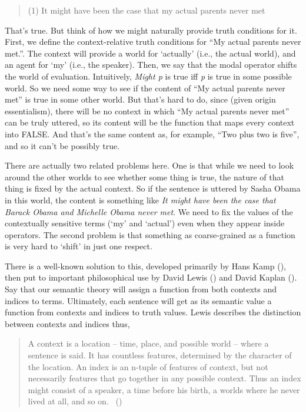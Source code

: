 \documentclass[
  11pt,
  letterpaper,
  DIV=11,
  numbers=noendperiod,
  twoside]{scrartcl}
\begin{document}
\begin{quote}
(1) It might have been the case that my actual parents never met
\end{quote}

That's true. But think of how we might naturally provide truth
conditions for it. First, we define the context-relative truth
conditions for ``My actual parents never met.''. The context will
provide a world for `actually' (i.e., the actual world), and an agent
for `my' (i.e., the speaker). Then, we say that the modal operator
shifts the world of evaluation. Intuitively, \emph{Might p} is true iff
\emph{p} is true in some possible world. So we need some way to see if
the content of ``My actual parents never met'' is true in some other
world. But that's hard to do, since (given origin essentialism), there
will be no context in which ``My actual parents never met'' can be truly
uttered, so its content will be the function that maps every context
into FALSE. And that's the same content as, for example, ``Two plus two
is five'', and so it can't be possibly true.

There are actually two related problems here. One is that while we need
to look around the other worlds to see whether some thing is true, the
nature of that thing is fixed by the actual context. So if the sentence
is uttered by Sasha Obama in this world, the content is something like
\emph{It might have been the case that Barack Obama and Michelle Obama
never met}. We need to fix the values of the contextually sensitive
terms (`my' and `actual') even when they appear inside operators. The
second problem is that something as coarse-grained as a function is very
hard to `shift' in just one respect.

There is a well-known solution to this, developed primarily by Hans Kamp
(), then put to important philosophical use
by David Lewis () and David Kaplan
(). Say that our semantic theory will
assign a function from both contexts and indices to terms. Ultimately,
each sentence will get as its semantic value a function from contexts
and indices to truth values. Lewis describes the distinction between
contexts and indices thus,

\begin{quote}
A context is a location -- time, place, and possible world -- where a
sentence is said. It has countless features, determined by the character
of the location. An index is an n-tuple of features of context, but not
necessarily features that go together in any possible context. Thus an
index might consist of a speaker, a time before his birth, a worlds
where he never lived at all, and so on.
~()
\end{quote}
\end{document}
